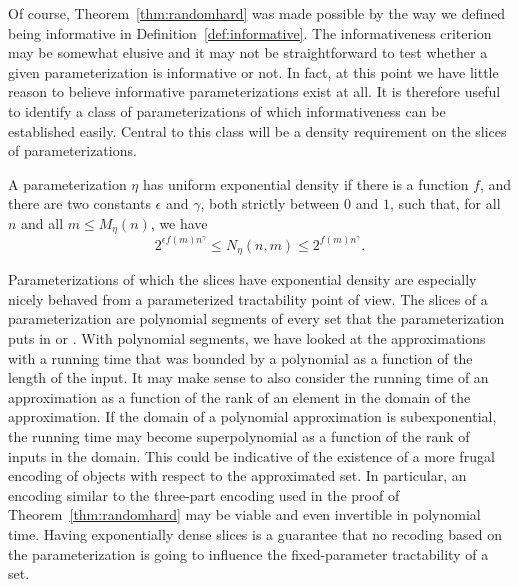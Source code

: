 Of course, Theorem~\ref{thm:randomhard} was made possible by the way we defined being informative in Definition~\ref{def:informative}.
The informativeness criterion may be somewhat elusive and it may not be straightforward to test whether a given parameterization is informative or not.
In fact, at this point we have little reason to believe informative parameterizations exist at all.
It is therefore useful to identify a class of parameterizations of which informativeness can be established easily.
Central to this class will be a density requirement on the slices of parameterizations.
\begin{definition}
  A parameterization $\eta$ has uniform exponential density if there is a function $f$, and there are two constants $\epsilon$ and $\gamma$, both strictly between $0$ and $1$, such that, for all $n$ and all $m \le M_\eta(n)$, we have
\begin{equation*}
  2^{\epsilon f(m) n^\gamma} \le N_\eta(n, m) \le 2^{f(m) n^\gamma}.
\end{equation*}
\end{definition}

Parameterizations of which the slices have exponential density are especially nicely behaved from a parameterized tractability point of view.
The slices of a parameterization are polynomial segments of every set that the parameterization puts in  or .
With polynomial segments, we have looked at the approximations with a running time that was bounded by a polynomial as a function of the length of the input.
It may make sense to also consider the running time of an approximation as a function of the rank of an element in the domain of the approximation.
If the domain of a polynomial approximation is subexponential, the running time may become superpolynomial as a function of the rank of inputs in the domain.
This could be indicative of the existence of a more frugal encoding of objects with respect to the approximated set.
In particular, an encoding similar to the three-part encoding used in the proof of Theorem~\ref{thm:randomhard} may be viable and even invertible in polynomial time.
Having exponentially dense slices is a guarantee that no recoding based on the parameterization is going to influence the fixed-parameter tractability of a set.

